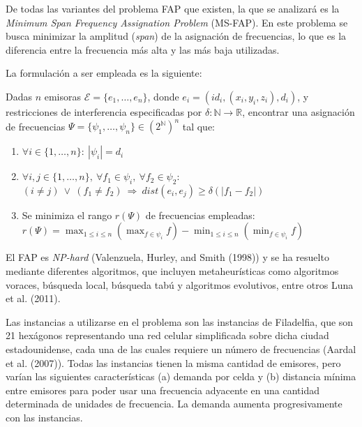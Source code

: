 \documentclass[
  11pt,
  a4paper,
]{article}
\begin{document}
De todas las variantes del problema FAP que existen, la que se analizará es la \textit{Minimum Span Frequency Assignation Problem} (MS-FAP). En este problema se busca minimizar la amplitud (\textit{span}) de la asignación de frecuencias, lo que es la diferencia entre la frecuencia más alta y las más baja utilizadas.

\clearpage

La formulación a ser empleada es la siguiente:

Dadas \(n\) emisoras \(\mathcal{E} = \{ e_{1}, \ldots, e_{n} \}\), donde \(e_{i} = (id_{i}, (x_{i}, y_{i}, z_{i}), d_{i})\), y restricciones de interferencia especificadas por \(\delta : \mathbb{N} \to \mathbb{R}\), encontrar una asignación de frecuencias \(\Psi = \{\psi_{1}, \ldots, \psi_{n}\} \in (2^{\mathbb{N}})^{n}\) tal que:

\begin{enumerate}
  \item $\forall i \in \{1, \ldots, n\} : \ |\psi_{i}| = d_{i}$

  \item $\forall i,j \in \{1, \ldots, n\}, \ \forall f_{1} \in \psi_{i}, \ \forall f_{2} \in \psi_{2}:$ 
  $(i \neq j) \ \lor \ (f_{1} \neq f_{2}) \ \Rightarrow \ dist(e_{i}, e_{j}) \geq \delta(|f_{1} - f_{2}|)$
  
  \item Se minimiza el rango $r(\Psi)$ de frecuencias empleadas:
  $r(\Psi) = \max_{1 \leq i \leq n} \left( \max_{f \in \psi_{i}} f \right) - \min_{1 \leq i \leq n} \left( \min_{f \in \psi_{i}} f \right)$
\end{enumerate}

El FAP es \textit{NP-hard} (Valenzuela, Hurley, and Smith (1998)) y se ha resuelto mediante diferentes algoritmos, que incluyen metaheurísticas como algoritmos voraces, búsqueda local, búsqueda tabú y algoritmos evolutivos, entre otros Luna et al. (2011).

Las instancias a utilizarse en el problema son las instancias de Filadelfia, que son 21 hexágonos representando una red celular simplificada sobre dicha ciudad estadounidense, cada una de las cuales requiere un número de frecuencias (Aardal et al. (2007)). Todas las instancias tienen la misma cantidad de emisores, pero varían las siguientes características (a) demanda por celda y (b) distancia mínima entre emisores para poder usar una frecuencia adyacente en una cantidad determinada de unidades de frecuencia. La demanda aumenta progresivamente con las instancias.
\end{document}
